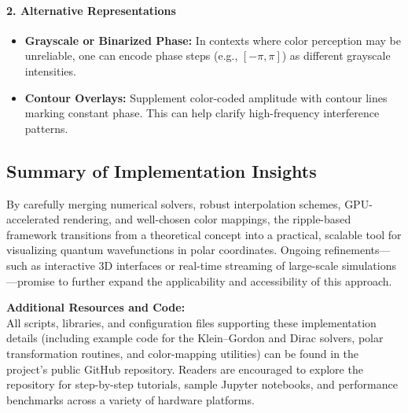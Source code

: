 \paragraph{2. Alternative Representations}
\begin{itemize}
    \item \textbf{Grayscale or Binarized Phase:} In contexts where color perception may be unreliable, one can encode phase steps (e.g., \([-\pi,\pi]\)) as different grayscale intensities.
    \item \textbf{Contour Overlays:} Supplement color-coded amplitude with contour lines marking constant phase. This can help clarify high-frequency interference patterns.
\end{itemize}

\subsection{Summary of Implementation Insights}
By carefully merging numerical solvers, robust interpolation schemes, GPU-accelerated rendering, and well-chosen color mappings, the ripple-based framework transitions from a theoretical concept into a practical, scalable tool for visualizing quantum wavefunctions in polar coordinates. Ongoing refinements—such as interactive 3D interfaces or real-time streaming of large-scale simulations—promise to further expand the applicability and accessibility of this approach.

\bigskip
\noindent
\textbf{Additional Resources and Code:}\\
All scripts, libraries, and configuration files supporting these implementation details (including example code for the Klein--Gordon and Dirac solvers, polar transformation routines, and color-mapping utilities) can be found in the project’s public GitHub repository. Readers are encouraged to explore the repository for step-by-step tutorials, sample Jupyter notebooks, and performance benchmarks across a variety of hardware platforms.

\newpage
